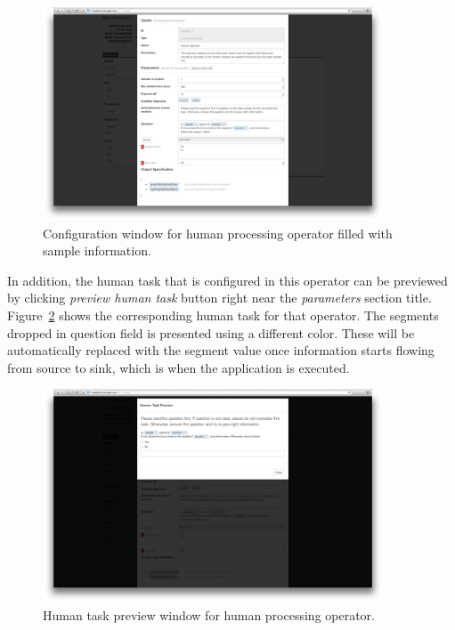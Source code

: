 \begin{figure}[ht]
	\centering
	\includegraphics[width=0.9\textwidth]{figures/tool/panel6.png}
	\caption{Configuration window for human processing operator filled with sample information.}
	\label{fig:panel6}
\end{figure}

In addition, the human task that is configured in this operator can be previewed 
by clicking \textit{preview human task} button right near the \textit{parameters} 
section title. Figure~\ref{fig:panel7} shows the corresponding human task for 
that operator. The segments dropped in question field is presented using a different 
color. These will be automatically replaced with the segment value once 
information starts flowing from source to sink, which is when the application 
is executed.

\begin{figure}[ht]
	\centering
	\includegraphics[width=0.9\textwidth]{figures/tool/panel7.png}
	\caption{Human task preview window for human processing operator.}
	\label{fig:panel7}
\end{figure}


